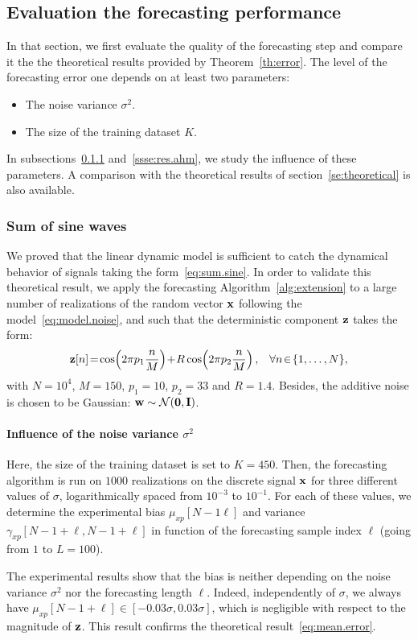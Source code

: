 \subsection{Evaluation the forecasting performance}
In that section, we first evaluate the quality of the forecasting step and compare it the the theoretical results provided by Theorem~\ref{th:error}. The level of the forecasting error one depends on at least two parameters:
\begin{itemize}
\item The noise variance $\sigma^2$.
\item The size of the training dataset $K$. 
\end{itemize}
In subsections~\ref{ssse:res.sine} and~\ref{ssse:res.ahm}, we study the influence of these parameters. A comparison with the theoretical results of section~\ref{se:theoretical} is also available.

\subsubsection{Sum of sine waves}
\label{ssse:res.sine}
We proved that the linear dynamic model is sufficient to catch the dynamical behavior of signals taking the form~\eqref{eq:sum.sine}. In order to validate this theoretical result, we apply the forecasting Algorithm~\ref{alg:extension} to a large number of realizations of the random vector ${\mathbf x}$ following the model~\eqref{eq:model.noise}, and such that the deterministic component ${\mathbf z}$ takes the form:
\[
\bz[n]\! =\!\cos\!\left(2\pi p_1 \dfrac{n}{M} \right)\! +\! R\cos\!\left(2\pi p_2 \dfrac{n}{M} \right),\quad \!\forall n\!\in\!\{1,\ldots,N\},
\]
with $N=10^4$, $M=150$, $p_1=10$, $p_2=33$ and $R=1.4$. Besides, the additive noise is chosen to be Gaussian: ${\mathbf w}\sim{\mathcal N}(\boldsymbol{0},{\mathbf I})$.

\paragraph{Influence of the noise variance $\sigma^2$} Here, the size of the training dataset is set to $K=450$. Then, the forecasting algorithm is run on $1000$ realizations on the discrete signal ${\mathbf x}$ for three different values of $\sigma$, logarithmically spaced from $10^{-3}$ to $10^{-1}$. For each of these values, we determine the experimental bias $\mu_{xp}[N-1\ell]$ and variance $\gamma_{xp}[N-1+\ell,N-1+\ell]$ in function of the forecasting sample index $\ell$ (going from $1$ to $L=100$).

The experimental results show that the bias is neither depending on the noise variance $\sigma^2$ nor the forecasting length $\ell$. Indeed, independently of $\sigma$, we always have $\mu_{xp}[N-1+\ell]\in\left[-0.03\sigma,0.03\sigma\right]$, which is negligible with respect to the magnitude of ${\mathbf z}$. This result confirms the theoretical result~\eqref{eq:mean.error}. 

